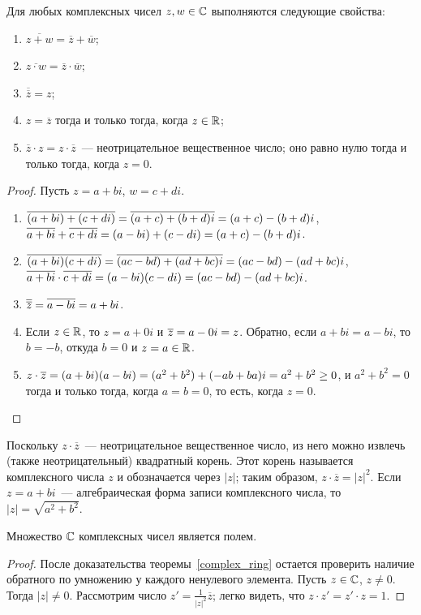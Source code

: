 \begin{proposition}
Для любых комплексных чисел $z,w\in\mathbb C$ выполняются следующие свойства:
\begin{enumerate}
\item $\overline{z+w}=\overline{z}+\overline{w}$;
\item $\overline{z\cdot w}=\overline{z}\cdot\overline{w}$;
\item $\overline{\overline{z}}=z$;
\item $z=\overline{z}$ тогда и только тогда, когда $z\in\mathbb R$;
\item $\overline{z}\cdot z=z\cdot\overline{z}$~--- неотрицательное
  вещественное число; оно равно нулю тогда и только тогда, когда
  $z=0$.
\end{enumerate}
\end{proposition}
\begin{proof}
Пусть $z=a+bi$, $w=c+di$.
\begin{enumerate}
\item $\overline{(a+bi)+(c+di)}=\overline{(a+c)+(b+d)i}=(a+c)-(b+d)i$,
  $\overline{a+bi}+\overline{c+di}=(a-bi)+(c-di)=(a+c)-(b+d)i$.
\item $\overline{(a+bi)(c+di)}=\overline{(ac-bd)+(ad+bc)i}=(ac-bd)-(ad+bc)i$,
  $\overline{a+bi}\cdot\overline{c+di}=(a-bi)(c-di)=(ac-bd)-(ad+bc)i$.
\item $\overline{\overline{z}}=\overline{a-bi}=a+bi$.
\item Если $z\in\mathbb R$, то $z=a+0i$ и $\overline{z}=a-0i=z$. Обратно, если
  $a+bi=a-bi$, то $b=-b$, откуда $b=0$ и $z=a\in\mathbb R$.
\item $z\cdot\overline{z}=(a+bi)(a-bi)=(a^2+b^2)+(-ab+ba)i=a^2+b^2\geq 0$, и
  $a^2+b^2=0$ тогда и только тогда, когда $a=b=0$, то есть, когда $z=0$.
\end{enumerate}
\end{proof}

\begin{definition}\label{dfn:absolute_value_complex}
Поскольку $z\cdot\overline{z}$~--- неотрицательное вещественное число,
из него можно извлечь (также неотрицательный) квадратный корень. Этот
корень называется  комплексного числа $z$ и
обозначается
через $|z|$; таким образом, $z\cdot\overline{z}=|z|^2$. Если
$z=a+bi$~--- алгебраическая форма записи комплексного числа, то
$|z|=\sqrt{a^2+b^2}$.
\end{definition}

\begin{proposition}
Множество $\mathbb C$ комплексных чисел является полем.
\end{proposition}
\begin{proof}
После доказательства теоремы~\ref{complex_ring} остается проверить
наличие обратного по умножению у каждого ненулевого элемента. Пусть
$z\in\mathbb C$, $z\neq 0$. Тогда $|z|\neq 0$. Рассмотрим число
$z'=\frac{1}{|z|^2}\overline{z}$; легко видеть, что $z\cdot z'=z'\cdot
z=1$.
\end{proof}

